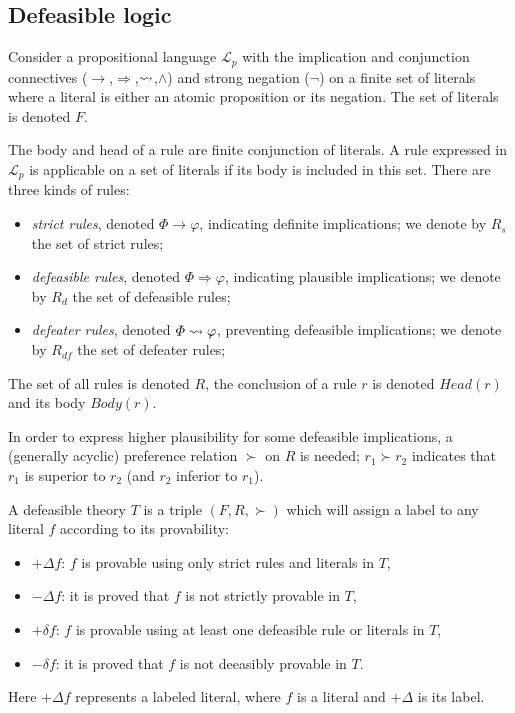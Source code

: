 \documentclass[version=3.21, pagesize, twoside=off, bibliography=totoc, DIV=calc, fontsize=12pt, a4paper, french, english]{scrartcl}
\begin{document}
\subsection{Defeasible logic}

Consider a propositional language $\mathcal{L}_p$ with the implication and conjunction connectives ($\rightarrow$,$\Rightarrow$,$\mathrel{\leadsto}$,$\land$) and strong negation ($\lnot$) on a finite set of literals where a literal is either an atomic proposition or its negation. 
The set of literals is denoted $F$.

The body and head of a rule are finite conjunction of literals. A rule expressed in $\mathcal{L}_p$ is applicable on a set of literals if its body is included in this set.
There are three kinds of rules:
\begin{itemize}
\item \emph{strict rules}, denoted $\Phi \rightarrow \varphi$, indicating definite implications; we denote by $R_s$ the set of strict rules;
\item \emph{defeasible rules}, denoted $\Phi \Rightarrow \varphi$, indicating plausible implications; we denote by $R_d$ the set of defeasible rules;
\item \emph{defeater rules}, denoted $\Phi \mathrel{\leadsto} \varphi$, preventing defeasible implications; we denote by $R_{df}$ the set of defeater rules;
\end{itemize}
The set of all rules is denoted $R$, the conclusion of a rule $r$ is denoted $Head(r)$ and its body $Body(r)$.

In order to express higher plausibility for some defeasible implications, a (generally acyclic) preference relation $\succ$ on $R$ is needed; $r_1 \succ r_2$ indicates that $r_1$ is superior to $r_2$ (and $r_2$ inferior to $r_1$).

A defeasible theory $T$ is a triple $(F,R,\succ)$ which will assign a label to any literal $f$ according to its provability:
\begin{itemize}
\item $+\Delta f$: $f$ is provable using only strict rules and literals in $T$,
\item $-\Delta f$: it is proved that $f$ is not strictly provable in $T$,
\item $+\delta f$: $f$ is provable using at least one defeasible rule or literals in $T$,
\item $-\delta f$: it is proved that $f$ is not deeasibly provable in $T$.
\end{itemize}
Here $+\Delta f$ represents a labeled literal, where $f$ is a literal and $+\Delta$ is its label.
\end{document}
